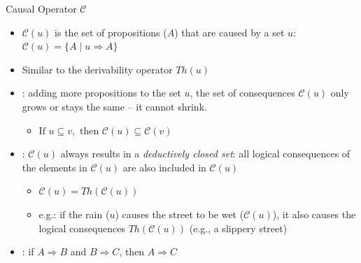 \documentclass{beamer} %
\begin{document}
\begin{frame}[allowframebreaks]{Causal Operator $\mathcal{C}$ }
    \begin{itemize}
        \item $\mathcal{C}(u)$ is the set of propositions ($A$) that are caused by a set $u$:  $\mathcal{C}(u) = \{ A \mid u \Rightarrow A \}$
        \item Similar to the derivability operator $Th(u)$ %
        \item {}: adding more propositions to the set $u$, the set of consequences $\mathcal{C}(u)$ only grows or stays the same – it cannot shrink.
        \begin{itemize}
            \item $\text{If } u \subseteq v, \text{ then } \mathcal{C}(u) \subseteq \mathcal{C}(v)$
        \end{itemize}
        \item {}: $\mathcal{C}(u)$ always results in a \emph{deductively closed set}: all logical consequences of the elements in $\mathcal{C}(u)$ are also included in $\mathcal{C}(u)$
        \begin{itemize}
            \item $\mathcal{C}(u) = Th(\mathcal{C}(u))$
            \item e.g.: if the rain ($u$) causes the street to be wet ($\mathcal{C}(u)$), it also causes the logical consequences $Th(\mathcal{C}(u))$ (e.g., a slippery street)
        \end{itemize}
        \item {}: if $A \Rightarrow B$ and $B \Rightarrow C$, then $A \Rightarrow C$
    \end{itemize}

\framebreak


\end{frame}
\end{document}
